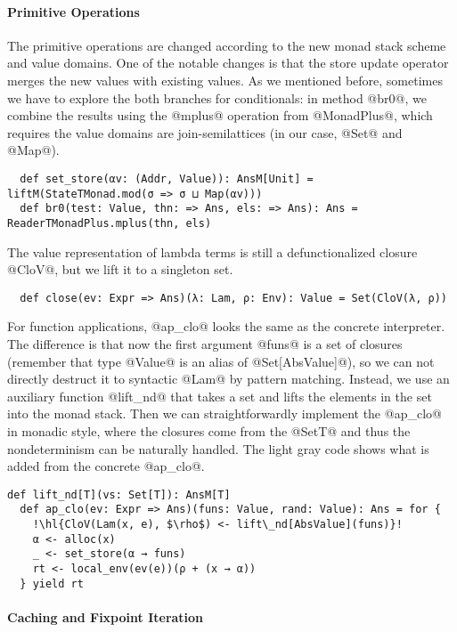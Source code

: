\paragraph{Primitive Operations} The primitive operations are changed according to
the new monad stack scheme and value domains. One of the notable changes is
that the store update operator merges the new values with existing values.
As we mentioned before, sometimes we have to explore the both branches for
conditionals: in method @br0@, we combine the results using the @mplus@
operation from @MonadPlus@, which requires the value domains are
join-semilattices (in our case, @Set@ and @Map@).
\begin{lstlisting}
  def set_store(αv: (Addr, Value)): AnsM[Unit] = liftM(StateTMonad.mod(σ => σ ⊔ Map(αv)))
  def br0(test: Value, thn: => Ans, els: => Ans): Ans = ReaderTMonadPlus.mplus(thn, els)
\end{lstlisting}

The value representation of lambda terms is still a defunctionalized closure
@CloV@, but we lift it to a singleton set.
\begin{lstlisting}
  def close(ev: Expr => Ans)(λ: Lam, ρ: Env): Value = Set(CloV(λ, ρ))
\end{lstlisting}

For function applications, @ap_clo@ looks the same as the concrete interpreter.
The difference is that now the first argument @funs@ is a set of closures (remember
that type @Value@ is an alias of @Set[AbsValue]@), so we can not directly
destruct it to syntactic @Lam@ by pattern matching. Instead, we use an
auxiliary function @lift_nd@ that takes a set and lifts the elements in the set
into the monad stack. Then we can straightforwardly implement the @ap_clo@ in
monadic style, where the closures come from the @SetT@ and thus the
nondeterminism can be naturally handled. The light gray code shows what is
added from the concrete
@ap_clo@.
\begin{lstlisting}[escapechar=!]
  def lift_nd[T](vs: Set[T]): AnsM[T]
  def ap_clo(ev: Expr => Ans)(funs: Value, rand: Value): Ans = for {
    !\hl{CloV(Lam(x, e), $\rho$) <- lift\_nd[AbsValue](funs)}!
    α <- alloc(x)
    _ <- set_store(α → funs)
    rt <- local_env(ev(e))(ρ + (x → α))
  } yield rt
\end{lstlisting}


\paragraph{Caching and Fixpoint Iteration}

